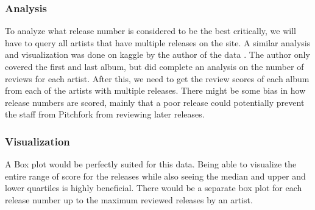 \documentclass{article}
\begin{document}
\hypertarget{analysis-1}{%
\subsubsection{Analysis}\label{analysis-1}}

To analyze what release number is considered to be the best critically,
we will have to query all artists that have multiple releases on the
site. A similar analysis and visualization was done on kaggle by the
author of the data \citep{kaggleFirst}. The author only covered the
first and last album, but did complete an analysis on the number of
reviews for each artist. After this, we need to get the review scores of
each album from each of the artists with multiple releases. There might
be some bias in how release numbers are scored, mainly that a poor
release could potentially prevent the staff from Pitchfork from
reviewing later releases.

\hypertarget{visualization-1}{%
\subsubsection{Visualization}\label{visualization-1}}

A Box plot would be perfectly suited for this data. Being able to
visualize the entire range of score for the releases while also seeing
the median and upper and lower quartiles is highly beneficial. There
would be a separate box plot for each release number up to the maximum
reviewed releases by an artist.



\end{document}
